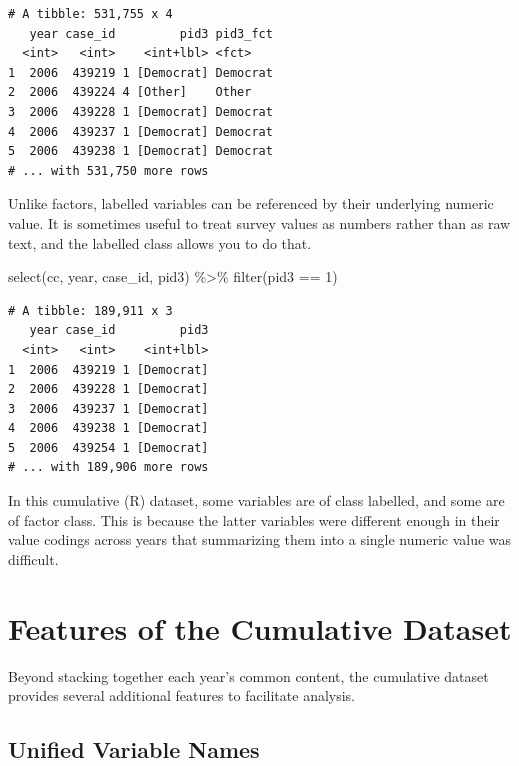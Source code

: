\documentclass[10pt,article,oneside]{memoir}
\theoremstyle{definition}
\newenvironment{Shaded}{\begin{snugshade}}{\end{snugshade}}
\newcommand{\DecValTok}[1]{\textcolor[rgb]{0.00,0.00,0.81}{#1}}
\newcommand{\FunctionTok}[1]{\textcolor[rgb]{0.00,0.00,0.00}{#1}}
\newcommand{\NormalTok}[1]{#1}
\newcommand{\SpecialCharTok}[1]{\textcolor[rgb]{0.00,0.00,0.00}{#1}}
\begin{document}
\begin{verbatim}
# A tibble: 531,755 x 4
   year case_id         pid3 pid3_fct
  <int>   <int>    <int+lbl> <fct>   
1  2006  439219 1 [Democrat] Democrat
2  2006  439224 4 [Other]    Other   
3  2006  439228 1 [Democrat] Democrat
4  2006  439237 1 [Democrat] Democrat
5  2006  439238 1 [Democrat] Democrat
# ... with 531,750 more rows
\end{verbatim}

\noindent Unlike factors, labelled variables can be referenced by their
underlying numeric value. It is sometimes useful to treat survey values
as numbers rather than as raw text, and the labelled class allows you to
do that.

\begin{Shaded}
\begin{Highlighting}[]
\FunctionTok{select}\NormalTok{(cc, year, case\_id, pid3) }\SpecialCharTok{\%\textgreater{}\%} 
  \FunctionTok{filter}\NormalTok{(pid3 }\SpecialCharTok{==} \DecValTok{1}\NormalTok{)}
\end{Highlighting}
\end{Shaded}

\begin{verbatim}
# A tibble: 189,911 x 3
   year case_id         pid3
  <int>   <int>    <int+lbl>
1  2006  439219 1 [Democrat]
2  2006  439228 1 [Democrat]
3  2006  439237 1 [Democrat]
4  2006  439238 1 [Democrat]
5  2006  439254 1 [Democrat]
# ... with 189,906 more rows
\end{verbatim}

\indent In this cumulative (R) dataset, some variables are of class
labelled, and some are of factor class. This is because the latter
variables were different enough in their value codings across years that
summarizing them into a single numeric value was difficult.

\newpage

\hypertarget{features-of-the-cumulative-dataset}{%
\section{Features of the Cumulative
Dataset}\label{features-of-the-cumulative-dataset}}

Beyond stacking together each year's common content, the cumulative
dataset provides several additional features to facilitate analysis.

\hypertarget{unified-variable-names}{%
\subsection{Unified Variable Names}\label{unified-variable-names}}
\end{document}
